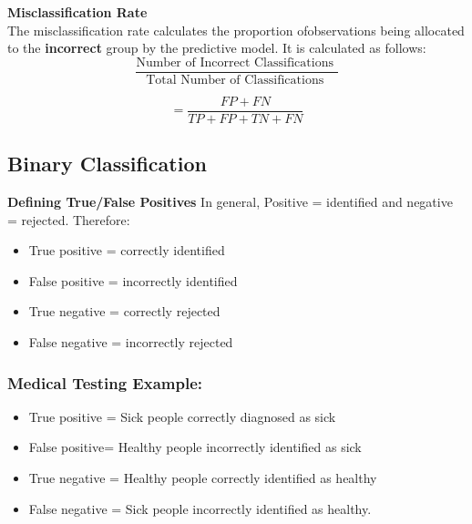 \documentclass[a4paper,12pt]{article}
\begin{document}
\medskip

\noindent \textbf{Misclassification Rate}\\
The misclassification rate calculates the proportion ofobservations being allocated to the \textbf{incorrect} group by the predictive model. It is calculated as follows:
\[ \frac{
\mbox{Number of Incorrect Classifications }}{\mbox{Total Number of Classifications }} \]

\[ = \frac{FP + FN}{TP+FP+TN+FN}\]
\medskip



\subsection{Binary Classification}
\noindent \textbf{Defining True/False Positives}
In general, Positive = identified and negative = rejected. Therefore:

\begin{itemize}
	\item True positive = correctly identified
	
	\item False positive = incorrectly identified
	
	\item True negative = correctly rejected
	
	\item False negative = incorrectly rejected
\end{itemize}
\subsubsection*{Medical Testing Example:}
\begin{itemize}
	\item True positive = Sick people correctly diagnosed as sick
	
	\item False positive= Healthy people incorrectly identified as sick
	
	\item True negative = Healthy people correctly identified as healthy
	
	\item False negative = Sick people incorrectly identified as healthy.
\end{itemize}



\end{document}
